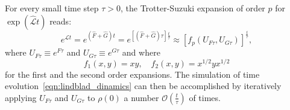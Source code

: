 For every small time step $\tau > 0$, the Trotter-Suzuki expansion of order $p$ for $\exp{(\hat{\mathcal{L}} t)}$ reads:
\begin{equation*}
    e^{\hat{\mathcal{L}}t} = e^{(\hat{F}+ \hat{G})t} = e^{[(\hat{F}+ \hat{G})\tau]\frac{t}{\tau}} \approx [f_p(U_{F\tau}, U_{G\tau})]^{\frac{t}{\tau}},
\end{equation*}
where $U_{F\tau} \equiv e^{F\tau}$ and $U_{G\tau} \equiv e^{G\tau}$ and where
\begin{equation*}
    f_1(x,y) = xy, \quad f_2(x, y) = x^{1/2}yx^{1/2}
\end{equation*}
for the first and the second order expansions.
The simulation of time evolution~\ref{eqn:lindblad_dinamics} can then be accomplished by iteratively applying $U_{F\tau}$ and $U_{G\tau}$ to $\rho(0)$ a number $\mathcal{O}(\frac{t}{\tau})$ of times.



